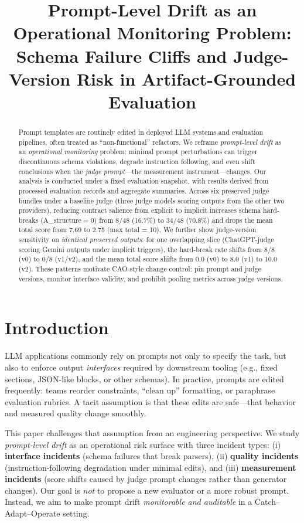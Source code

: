 \documentclass{article}
\title{Prompt-Level Drift as an Operational Monitoring Problem:\\
Schema Failure Cliffs and Judge-Version Risk in Artifact-Grounded Evaluation}
\author{}
\newcommand{\Astruct}{A\_structure}
\begin{document}
\raggedbottom
\maketitle

\begin{abstract}
Prompt templates are routinely edited in deployed LLM systems and evaluation pipelines, often treated as ``non-functional'' refactors.
We reframe \emph{prompt-level drift} as an \emph{operational monitoring} problem: minimal prompt perturbations can trigger discontinuous schema violations, degrade instruction following, and even shift conclusions when the \emph{judge prompt}—the measurement instrument—changes.
Our analysis is conducted under a fixed evaluation snapshot, with results derived from processed evaluation records and aggregate summaries.
Across six preserved judge bundles under a baseline judge (three judge models scoring outputs from the other two providers), reducing contract salience from explicit to implicit increases schema hard-breaks (\Astruct$=0$) from $8/48$ (16.7\%) to $34/48$ (70.8\%) and drops the mean total score from 7.69 to 2.75 (max total = 10).
We further show judge-version sensitivity on \emph{identical preserved outputs}: for one overlapping slice (ChatGPT-judge scoring Gemini outputs under implicit triggers), the hard-break rate shifts from $8/8$ (v0) to $0/8$ (v1/v2), and the mean total score shifts from 0.0 (v0) to 8.0 (v1) to 10.0 (v2).
These patterns motivate CAO-style change control: pin prompt and judge versions, monitor interface validity, and prohibit pooling metrics across judge versions.
\end{abstract}

\section{Introduction}
LLM applications commonly rely on prompts not only to specify the task, but also to enforce output \emph{interfaces} required by downstream tooling (e.g., fixed sections, JSON-like blocks, or other schemas).
In practice, prompts are edited frequently: teams reorder constraints, ``clean up'' formatting, or paraphrase evaluation rubrics.
A tacit assumption is that these edits are safe---that behavior and measured quality change smoothly.

This paper challenges that assumption from an engineering perspective.
We study \emph{prompt-level drift} as an operational risk surface with three incident types:
(i) \textbf{interface incidents} (schema failures that break parsers),
(ii) \textbf{quality incidents} (instruction-following degradation under minimal edits), and
(iii) \textbf{measurement incidents} (score shifts caused by judge prompt changes rather than generator changes).
Our goal is \emph{not} to propose a new evaluator or a more robust prompt.
Instead, we aim to make prompt drift \emph{monitorable and auditable} in a Catch--Adapt--Operate setting.
\end{document}
